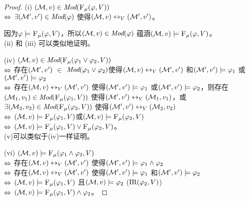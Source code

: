 \begin{proof}
	(i) $({\cal M},v) \in \textit{Mod}({\textsc{F}_{\textsc{$\mu$}}}(\varphi, V))$\\
	$\Leftrightarrow$ $\exists ({\cal M}',v') \in \textit{Mod}(\varphi)$ 使得$({\cal M}, v) \leftrightarrow_V ({\cal M}',v')$。
	
	因为$\varphi \models {\textsc{F}_{\textsc{$\mu$}}}(\varphi, V)$，所以$({\cal M},v) \in \textit{Mod}(\varphi)$ 蕴涵$({\cal M},v) \models {\textsc{F}_{\textsc{$\mu$}}}(\varphi, V)$。\\
	
	
	(ii) 和 (iii) 可以类似地证明。
	
	(iv)  $({\cal M},v)\in \textit{Mod}({\textsc{F}_{\textsc{$\mu$}}}(\varphi_1 \vee \varphi_2, V))$\\
	$\Leftrightarrow$ 存在$({\cal M}',v')$ $\in$  $\textit{Mod}(\varphi_1\vee \varphi_2)$使得$({\cal M},v) \leftrightarrow_V ({\cal M}',v')$ 和$({\cal M}',v') \models \varphi_1$ 或$({\cal M}',v') \models \varphi_2$ \\
	$\Leftrightarrow$ 存在$({\cal M},v) \leftrightarrow_V ({\cal M}',v')$ 使得$({\cal M}',v') \models \varphi_1$ 或$({\cal M}',v') \models \varphi_2$，则存在$({\cal M}_1,v_1) \in \textit{Mod}({\textsc{F}_{\textsc{$\mu$}}}(\varphi_1, V))$ 使得$({\cal M}',v') \leftrightarrow_V ({\cal M}_1,v_1)$，或$\exists({\cal M}_2,v_2) \in \textit{Mod}({\textsc{F}_{\textsc{$\mu$}}}(\varphi_2, V))$ 使得$({\cal M}',v') \leftrightarrow_V ({\cal M}_2,v_2)$\\
	$\Leftrightarrow$ $({\cal M},v) \models {\textsc{F}_{\textsc{$\mu$}}}(\varphi_1, V)$或$({\cal M},v) \models  {\textsc{F}_{\textsc{$\mu$}}}(\varphi_2, V)$\\
	$\Leftrightarrow$ $({\cal M},v) \models {\textsc{F}_{\textsc{$\mu$}}}(\varphi_1, V) \vee {\textsc{F}_{\textsc{$\mu$}}}(\varphi_2, V)$。
	\\
	
	
	(v)可以类似于(iv)一样证明。
	
	(vi) $({\cal M},v) \models {\textsc{F}_{\textsc{$\mu$}}}(\varphi_1 \wedge \varphi_2,V)$\\
	$\Leftrightarrow$ 存在$({\cal M}, v) \leftrightarrow_V ({\cal M}',v')$ 使得$({\cal M}',v') \models \varphi_1 \wedge \varphi_2$\\
	$\Leftrightarrow$ 存在$({\cal M}, v) \leftrightarrow_V ({\cal M}',v')$ 使得$({\cal M}', v') \models \varphi_1$ 和$({\cal M}', v') \models \varphi_2$\\
	$\Leftrightarrow$  $({\cal M}, v) \models {\textsc{F}_{\textsc{$\mu$}}}(\varphi_1,V)$ 且$({\cal M},v) \models \varphi_2$ \hfill ($\textrm{IR}(\varphi_2, V)$)\\
	$\Leftrightarrow$ $({\cal M},v) \models {\textsc{F}_{\textsc{$\mu$}}}(\varphi_1,V) \wedge \varphi_2$。
\end{proof}

